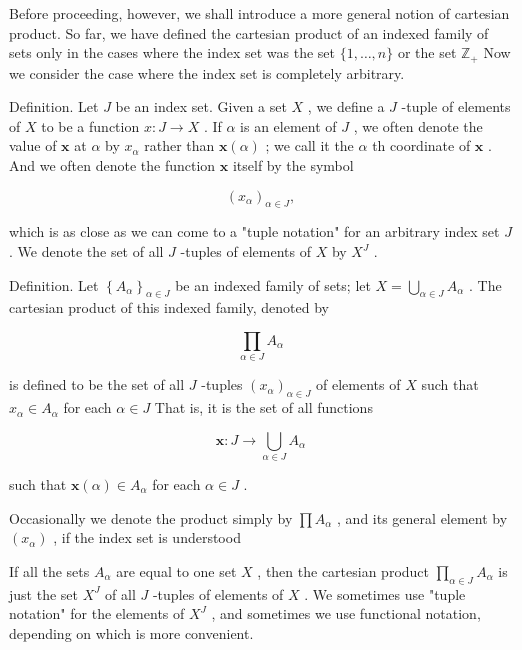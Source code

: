 \documentclass[10pt]{article}
\begin{document}
Before proceeding, however, we shall introduce a more general notion of cartesian product. So far, we have defined the cartesian product of an indexed family of sets only in the cases where the index set was the set \(\{ 1,\ldots ,n\}\) or the set \({\mathbb{Z}}_{ + }\) Now we consider the case where the index set is completely arbitrary.

Definition. Let \(J\) be an index set. Given a set \(X\) , we define a \(J\) -tuple of elements of \(X\) to be a function \(x : J \rightarrow  X\) . If \(\alpha\) is an element of \(J\) , we often denote the value of \(\mathbf{x}\) at \(\alpha\) by \({x}_{\alpha }\) rather than \(\mathbf{x}\left( \alpha \right)\) ; we call it the \(\alpha\) th coordinate of \(\mathbf{x}\) . And we often denote the function \(\mathbf{x}\) itself by the symbol

\[
{\left( {x}_{\alpha }\right) }_{\alpha  \in  J},
\]

which is as close as we can come to a "tuple notation" for an arbitrary index set \(J\) . We denote the set of all \(J\) -tuples of elements of \(X\) by \({X}^{J}\) .

Definition. Let \({\left\{  {A}_{\alpha }\right\}  }_{\alpha  \in  J}\) be an indexed family of sets; let \(X = \mathop{\bigcup }\limits_{{\alpha  \in  J}}{A}_{\alpha }\) . The cartesian product of this indexed family, denoted by

\[
\mathop{\prod }\limits_{{\alpha  \in  J}}{A}_{\alpha }
\]

is defined to be the set of all \(J\) -tuples \({\left( {x}_{\alpha }\right) }_{\alpha  \in  J}\) of elements of \(X\) such that \({x}_{\alpha } \in  {A}_{\alpha }\) for each \(\alpha  \in  J\) That is, it is the set of all functions

\[
\mathbf{x} : J \rightarrow  \mathop{\bigcup }\limits_{{\alpha  \in  J}}{A}_{\alpha }
\]

such that \(\mathbf{x}\left( \alpha \right)  \in  {A}_{\alpha }\) for each \(\alpha  \in  J\) .

Occasionally we denote the product simply by \(\prod {A}_{\alpha }\) , and its general element by \(\left( {x}_{\alpha }\right)\) , if the index set is understood

If all the sets \({A}_{\alpha }\) are equal to one set \(X\) , then the cartesian product \(\mathop{\prod }\limits_{{\alpha  \in  J}}{A}_{\alpha }\) is just the set \({X}^{J}\) of all \(J\) -tuples of elements of \(X\) . We sometimes use "tuple notation" for the elements of \({X}^{J}\) , and sometimes we use functional notation, depending on which is more convenient.
\end{document}
